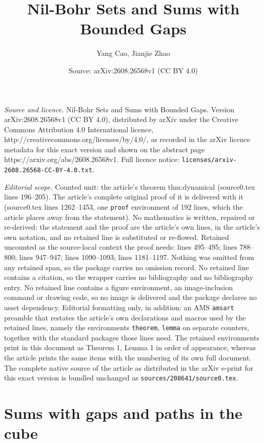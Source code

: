 \documentclass[10pt,a4paper]{amsart}
\title{Nil-Bohr Sets and Sums with Bounded Gaps}
\author{Yang Cao, Jianjie Zhao}
\date{Source: arXiv:2608.26568v1 (CC BY 4.0)}
\begin{document}
\maketitle

\noindent\emph{Source and licence.} Nil-Bohr Sets and Sums with Bounded Gaps. Version arXiv:2608.26568v1 (CC BY 4.0), distributed by arXiv under the Creative Commons Attribution 4.0 International licence, http://creativecommons.org/licenses/by/4.0/, as recorded in the arXiv licence metadata for this exact version and shown on the abstract page https://arxiv.org/abs/2608.26568v1. Full licence notice: \texttt{licenses/arxiv-2608.26568-CC-BY-4.0.txt}.\par\smallskip

\noindent\textit{Editorial scope.} Counted unit: the article's theorem thm:dynamical (source0.tex lines 196--205). The article's complete original proof of it is delivered with it (source0.tex lines 1262--1453, one \texttt{proof} environment of 192 lines, which the article places away from the statement). No mathematics is written, repaired or re-derived: the statement and the proof are the article's own lines, in the article's own notation, and no retained line is substituted or re-flowed.  Retained uncounted as the source-local context the proof needs: lines 495--495; lines 788--800; lines 947--947; lines 1090--1093; lines 1181--1197.  Nothing was omitted from any retained span, so the package carries no omission record.  No retained line contains a citation, so the wrapper carries no bibliography and no bibliography entry.  No retained line contains a figure environment, an image-inclusion command or drawing code, so no image is delivered and the package declares no asset dependency.  Editorial formatting only, in addition: an AMS \texttt{amsart} preamble that restates the article's own declarations and macros used by the retained lines, namely the environments \texttt{theorem}, \texttt{lemma} on separate counters, together with the standard packages those lines need.  The retained environments print in this document as Theorem 1, Lemma 1 in order of appearance, whereas the article prints the same items with the numbering of its own full document.  The complete native source of the article as distributed in the arXiv e-print for this exact version is bundled unchanged as \texttt{sources/208641/source0.tex}.
\section{Sums with gaps and paths in the cube}\label{sec:cube}
\end{document}
